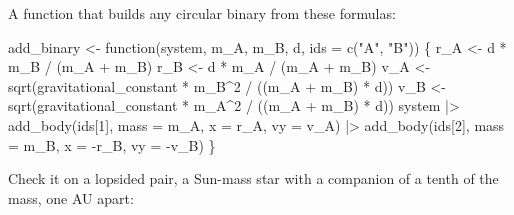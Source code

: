 \documentclass[
  10.5pt,
  letterpaper,
]{scrbook}
\newenvironment{Shaded}{\begin{snugshade}}{\end{snugshade}}
\newcommand{\AttributeTok}[1]{\textcolor[rgb]{0.00,0.00,0.00}{#1}}
\newcommand{\ControlFlowTok}[1]{\textcolor[rgb]{0.00,0.00,0.00}{#1}}
\newcommand{\DecValTok}[1]{\textcolor[rgb]{0.00,0.00,0.00}{#1}}
\newcommand{\FunctionTok}[1]{\textcolor[rgb]{0.00,0.00,0.00}{#1}}
\newcommand{\NormalTok}[1]{\textcolor[rgb]{0.00,0.00,0.00}{#1}}
\newcommand{\OtherTok}[1]{\textcolor[rgb]{0.00,0.00,0.00}{#1}}
\newcommand{\SpecialCharTok}[1]{\textcolor[rgb]{0.00,0.00,0.00}{#1}}
\newcommand{\StringTok}[1]{\textcolor[rgb]{0.00,0.00,0.00}{#1}}
\theoremstyle{definition}
\theoremstyle{plain}
\theoremstyle{remark}
\begin{document}
A function that builds any circular binary from these formulas:

\begin{Shaded}
\begin{Highlighting}[]
\NormalTok{add\_binary }\OtherTok{\textless{}{-}} \ControlFlowTok{function}\NormalTok{(system, m\_A, m\_B, d, }\AttributeTok{ids =} \FunctionTok{c}\NormalTok{(}\StringTok{"A"}\NormalTok{, }\StringTok{"B"}\NormalTok{)) \{}
\NormalTok{  r\_A }\OtherTok{\textless{}{-}}\NormalTok{ d }\SpecialCharTok{*}\NormalTok{ m\_B }\SpecialCharTok{/}\NormalTok{ (m\_A }\SpecialCharTok{+}\NormalTok{ m\_B)}
\NormalTok{  r\_B }\OtherTok{\textless{}{-}}\NormalTok{ d }\SpecialCharTok{*}\NormalTok{ m\_A }\SpecialCharTok{/}\NormalTok{ (m\_A }\SpecialCharTok{+}\NormalTok{ m\_B)}
\NormalTok{  v\_A }\OtherTok{\textless{}{-}} \FunctionTok{sqrt}\NormalTok{(gravitational\_constant }\SpecialCharTok{*}\NormalTok{ m\_B}\SpecialCharTok{\^{}}\DecValTok{2} \SpecialCharTok{/}\NormalTok{ ((m\_A }\SpecialCharTok{+}\NormalTok{ m\_B) }\SpecialCharTok{*}\NormalTok{ d))}
\NormalTok{  v\_B }\OtherTok{\textless{}{-}} \FunctionTok{sqrt}\NormalTok{(gravitational\_constant }\SpecialCharTok{*}\NormalTok{ m\_A}\SpecialCharTok{\^{}}\DecValTok{2} \SpecialCharTok{/}\NormalTok{ ((m\_A }\SpecialCharTok{+}\NormalTok{ m\_B) }\SpecialCharTok{*}\NormalTok{ d))}
\NormalTok{  system }\SpecialCharTok{|\textgreater{}}
    \FunctionTok{add\_body}\NormalTok{(ids[}\DecValTok{1}\NormalTok{], }\AttributeTok{mass =}\NormalTok{ m\_A, }\AttributeTok{x =}\NormalTok{  r\_A, }\AttributeTok{vy =}\NormalTok{  v\_A) }\SpecialCharTok{|\textgreater{}}
    \FunctionTok{add\_body}\NormalTok{(ids[}\DecValTok{2}\NormalTok{], }\AttributeTok{mass =}\NormalTok{ m\_B, }\AttributeTok{x =} \SpecialCharTok{{-}}\NormalTok{r\_B, }\AttributeTok{vy =} \SpecialCharTok{{-}}\NormalTok{v\_B)}
\NormalTok{\}}
\end{Highlighting}
\end{Shaded}

Check it on a lopsided pair, a Sun-mass star with a companion of a tenth
of the mass, one AU apart:
\end{document}
